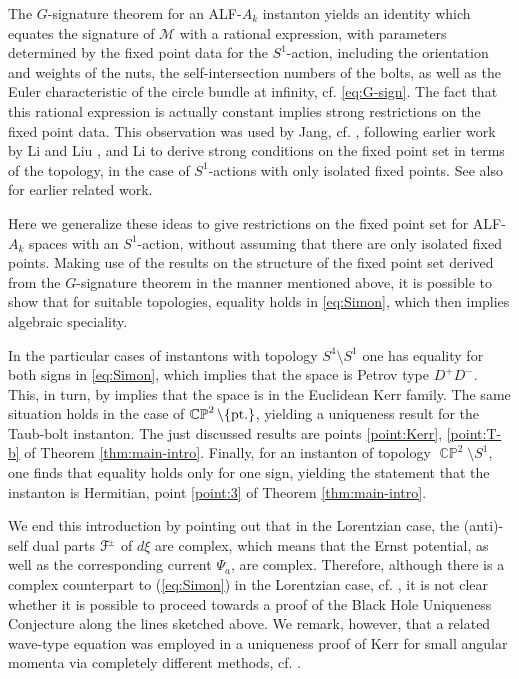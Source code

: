 \documentclass[a4paper,11pt,reqno]{amsart}
\newcommand{\cM}{\mathcal{M}}
\theoremstyle{plain}
\DeclareMathOperator{\CP}{\mathbb{C}\mathbb{P}}
\newcommand{\PM}[1]{{{#1}^{\hspace{-.5pt}\scaleto{\pm}{3.5pt}}}}
\def\Fcal{\mathcal{F}}
\numberwithin{equation}{section}
\begin{document}
The $G$-signature theorem for an ALF-$A_k$ instanton yields an identity which equates the signature of $\cM$ with a rational expression, with parameters determined by the fixed point data for the $S^1$-action, including the orientation and weights of the nuts, the self-intersection numbers of the bolts, as well as the Euler characteristic of the circle bundle at infinity, cf. \eqref{eq:G-sign}. The fact that this rational expression is actually constant implies strong restrictions on the fixed point data. This observation was used by Jang, cf.  \cite{2018JGP...133..181J}, following earlier work by Li and Liu \cite{2010arXiv1012.1507L}, and Li \cite{MR3343967} to derive strong conditions on the fixed point set in terms of the topology, in the case of $S^1$-actions with only isolated fixed points. See also \cite{MR1201437} for earlier related work. 

Here we generalize these ideas to give restrictions on the fixed point set for ALF-$A_k$ spaces with an $S^1$-action, without assuming that there are only isolated fixed points.  Making use of the results on the structure of the fixed point set derived from the $G$-signature theorem in the manner mentioned above, it is possible to show that for suitable topologies, equality holds in \eqref{eq:Simon}, which then implies algebraic speciality. 

In the particular cases of instantons with topology $S^4\setminus S^1$ one has equality for both signs in \eqref{eq:Simon}, which implies that the space is Petrov type $D^+D^-$. 
This, in turn, by \cite{Biquard:Gauduchon}  implies that the space is in the Euclidean Kerr family. The same situation holds in the case of $\CP^2 \setminus \{\text{\rm pt.}\}$, yielding a uniqueness result for the Taub-bolt instanton. The just discussed results are points \ref{point:Kerr}, \ref{point:T-b} of Theorem \ref{thm:main-intro}. Finally, for an instanton of topology $\CP^2 \setminus S^1$, one finds that equality holds only for one sign, yielding the statement that the instanton is Hermitian, point \ref{point:3} of Theorem \ref{thm:main-intro}.  

We end this introduction by pointing out that in the Lorentzian case, the (anti)-self dual parts $\PM{\Fcal}$ of $d\xi$ are complex, which means that the Ernst potential, as well as the corresponding current $\Psi_a$, are complex. Therefore, although there is a 
complex counterpart  to (\ref{eq:Simon})  in the Lorentzian case, cf. \cite{MR747036}, it is not clear whether it is possible to proceed towards a proof of the Black Hole Uniqueness Conjecture along the lines sketched above. We remark, however, that
a related wave-type equation was employed in a uniqueness proof of Kerr for small angular momenta via completely different methods, cf. \cite{MR2672799,MR2461426}. 
\end{document}
